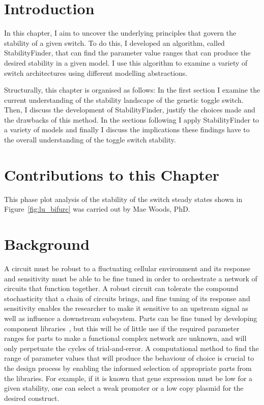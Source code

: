 \section{Introduction}

In this chapter, I aim to uncover the underlying principles that govern the stability of a given switch. To do this, I developed an algorithm, called StabilityFinder, that can find the parameter value ranges that can produce the desired stability in a given model. I use this algorithm to examine a variety of switch architectures using different modelling abstractions.

Structurally, this chapter is organised as follows: In the first section I examine the current understanding of the stability landscape of the genetic toggle switch. Then, I discuss the development of StabilityFinder, justify the choices made and the drawbacks of this method. In the sections following I apply StabilityFinder to a variety of models and finally I discuss the implications these findings have to the overall understanding of the toggle switch stability. 

\section{Contributions to this Chapter}
This phase plot analysis of the stability of the switch steady states shown in Figure~\ref{fig:lu_bifurc} was carried out by Mae Woods, PhD.

\section{Background}
A circuit must be robust to a fluctuating cellular environment and its response and sensitivity must be able to be fine tuned in order to orchestrate a network of circuits that function together. A robust circuit can tolerate the compound stochasticity that a chain of circuits brings, and fine tuning of its response and sensitivity enables the researcher to make it sensitive to an upstream signal as well as influence a downstream subsystem. Parts can be fine tuned by developing component libraries~\autocite{Lu:2009ez,}, but this will be of little use if the required parameter ranges for parts to make a functional complex network are unknown, and will only perpetuate the cycles of trial-and-error. A computational method to find the range of parameter values that will produce the behaviour of choice is crucial to the design process by enabling the informed selection of appropriate parts from the libraries. For example, if it is known that gene expression must be low for a given stability, one can select a weak promoter or a low copy plasmid for the desired construct. 

